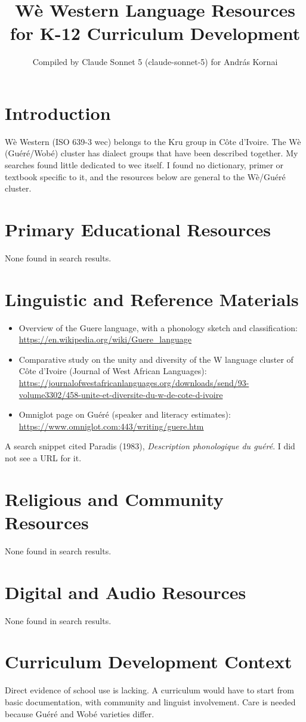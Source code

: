 \documentclass[12pt]{article}
\title{W\`e Western Language Resources for K-12 Curriculum Development}
\author{Compiled by Claude Sonnet 5 (claude-sonnet-5) for Andr\'as Kornai}
\date{}
\begin{document}
\maketitle
\section{Introduction}
W\`e Western (ISO 639-3 wec) belongs to the Kru group in C\^ote d'Ivoire. The W\`e (Gu\'er\'e/Wob\'e) cluster has dialect groups that have been described together. My searches found little dedicated to wec itself. I found no dictionary, primer or textbook specific to it, and the resources below are general to the W\`e/Gu\'er\'e cluster.
\section{Primary Educational Resources}
None found in search results.
\section{Linguistic and Reference Materials}
\begin{itemize}
\item Overview of the Guere language, with a phonology sketch and classification: \url{https://en.wikipedia.org/wiki/Guere_language}
\item Comparative study on the unity and diversity of the W language cluster of C\^ote d'Ivoire (Journal of West African Languages): \url{https://journalofwestafricanlanguages.org/downloads/send/93-volume3302/458-unite-et-diversite-du-w-de-cote-d-ivoire}
\item Omniglot page on Gu\'er\'e (speaker and literacy estimates): \url{https://www.omniglot.com:443/writing/guere.htm}
\end{itemize}
A search snippet cited Paradis (1983), \emph{Description phonologique du gu\'er\'e}. I did not see a URL for it.
\section{Religious and Community Resources}
None found in search results.
\section{Digital and Audio Resources}
None found in search results.
\section{Curriculum Development Context}
Direct evidence of school use is lacking. A curriculum would have to start from basic documentation, with community and linguist involvement. Care is needed because Gu\'er\'e and Wob\'e varieties differ.
\end{document}
